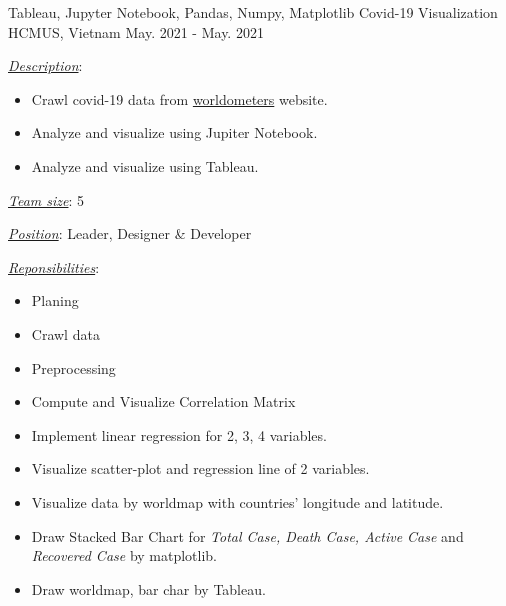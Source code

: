 \begin{cventries}
  \cventry
    {Tableau, Jupyter Notebook, Pandas, Numpy, Matplotlib} %
    {Covid-19 Visualization} %
    {HCMUS, Vietnam} %
    {May. 2021 - May. 2021} %
    {
      \begin{cvitems} %
        \item \underline{\textit{Description}}:
        \begin{itemize}
          \item Crawl covid-19 data from \href{https://worldometers.info}{worldometers} website.
          \item Analyze and visualize using Jupiter Notebook.
          \item Analyze and visualize using Tableau.
        \end{itemize}
        \item \underline{\textit{Team size}}: 5
        \item \underline{\textit{Position}}: Leader, Designer \& Developer
        \item \underline{\textit{Reponsibilities}}: 
        \begin{itemize}
          \item Planing
          \item Crawl data
          \item Preprocessing
          \item Compute and Visualize Correlation Matrix
          \item Implement linear regression for 2, 3, 4 variables.
          \item Visualize scatter-plot and regression line of 2 variables.
          \item Visualize data by worldmap with countries' longitude and latitude.
          \item Draw Stacked Bar Chart for \textit{Total Case, Death Case, Active Case} and \textit{Recovered Case} by matplotlib.
          \item Draw worldmap, bar char by Tableau.
        \end{itemize}
      \end{cvitems}
    }


\end{cventries}
